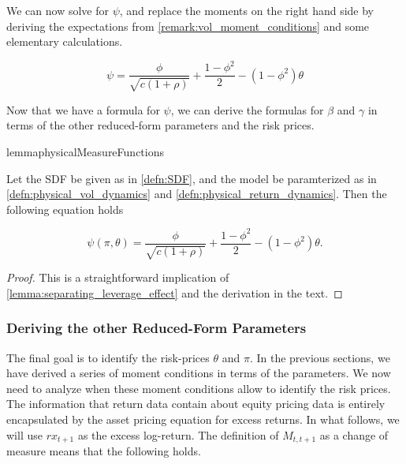\documentclass[11pt, letterpaper, twoside, final]{article}
\begin{document}
We can now solve for $\psi$, and replace the moments on the right hand side by deriving the expectations from
\cref{remark:vol_moment_conditions} and some elementary calculations. 

\begin{equation}
    \label{eqn:psi_pp_as_func_of_params}
    \psi = \frac{\phi}{\sqrt{c (1 + \rho)}} + \frac{1 - \phi^2}{2}  - (1 - \phi^2) \theta
\end{equation}

Now that we have a formula for $\psi$, we can derive the formulas for $\beta$ and $\gamma$ in terms of the
other reduced-form parameters and the risk prices. 

\begin{restatable}{lemma}{physicalMeasureFunctions}

    \label{lemma:psi_function}
    
    Let the SDF be given as in \cref{defn:SDF}, and the model be paramterized as in
    \cref{defn:physical_vol_dynamics} and \cref{defn:physical_return_dynamics}. 
    Then the following equation holds

    \begin{equation}
        \psi(\pi, \theta) = \frac{\phi}{\sqrt{c (1 + \rho)}} + \frac{1 - \phi^2}{2} - (1 - \phi^2) \theta.  
    \end{equation}
\end{restatable}

\begin{proof}
    This is a straightforward implication of \cref{lemma:separating_leverage_effect} and the derivation in the
    text.
\end{proof}

\subsubsection{Deriving the other Reduced-Form Parameters}

The final goal is to identify the risk-prices $\theta$ and $\pi$.
In the previous sections, we have derived a series of moment conditions in terms of the parameters.
We now need to analyze when these moment conditions allow to identify the risk prices. 
The information that return data contain about equity pricing data is entirely encapsulated by the asset pricing
equation for excess returns.  
In what follows, we will use $rx_{t+1}$ as the excess log-return.
The definition of $M_{t,t+1}$ as a change of measure means that the following holds.
\end{document}
